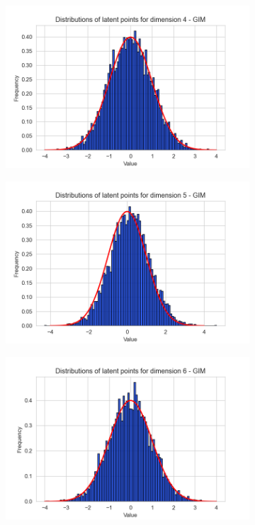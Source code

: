 \begin{figure}[h]
\begin{subfigure}[b]{0.25\textwidth}
	\end{subfigure}
	\hfill
	\begin{subfigure}[b]{0.25\textwidth}
		\centering
		\includegraphics[width=1\linewidth]{"graphs/distr/module1 kld0035/_ distribution_latent_space_GIM_dim=3"}
	\end{subfigure}
	\hfill
	\begin{subfigure}[b]{0.25\textwidth}
		\centering
		\includegraphics[width=1\linewidth]{"graphs/distr/module1 kld0035/_ distribution_latent_space_GIM_dim=4"}
	\end{subfigure}
	\hfill
	\begin{subfigure}[b]{0.25\textwidth}
		\centering
		\includegraphics[width=1\linewidth]{"graphs/distr/module1 kld0035/_ distribution_latent_space_GIM_dim=5"}

\end{subfigure}
\end{figure}
